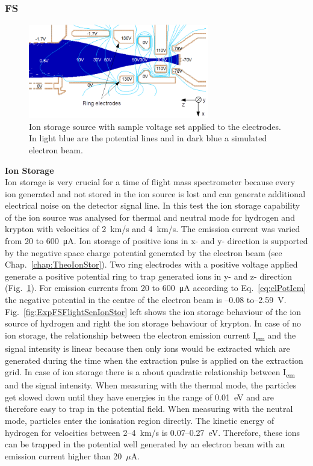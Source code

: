		\subsubsection{FS }\label{chap:FSCalib}
		\begin{figure}[H]
			\centering
			\includegraphics[width = 0.7\textwidth]{Experiments/FiL_IS_elBeam_Storage.png}
			\caption{Ion storage source with sample voltage set applied to the electrodes. In light blue are the potential lines and in dark blue a simulated electron beam.}
			\label{fig:ExpFSFlightSenIonStorIS}
		\end{figure}
		\textbf{Ion Storage}\\
		Ion storage is very crucial for a time of flight mass spectrometer because every ion generated and not stored in the ion source is lost and can generate additional electrical noise on the detector signal line. In this test the ion storage capability of the ion source was analysed for thermal and neutral mode for hydrogen and krypton with velocities of 2~km/s and 4~km/s. The emission current was varied from 20 to 600~\si{\micro\ampere}. Ion storage of positive ions in x- and y- direction is supported by the negative space charge potential generated by the electron beam (see Chap.~\ref{chap:TheoIonStor}). Two ring electrodes with a positive voltage applied generate a positive potential ring to trap generated ions in y- and z- direction (Fig.~\ref{fig:ExpFSFlightSenIonStorIS}). For emission currents from 20 to 600~\si{\micro\ampere} according to Eq.~\eqref{eq:elPotIem} the negative potential in the centre of the electron beam is --0.08 to--2.59~\si{\volt}. Fig.~\ref{fig:ExpFSFlightSenIonStor} left shows the ion storage behaviour of the ion source of hydrogen and right the ion storage behaviour of krypton. In case of no ion storage, the relationship between the electron emission current I\textsubscript{em} and the signal intensity is linear because then only ions would be extracted which are generated during the time when the extraction pulse is applied on the extraction grid. In case of ion storage there is a about quadratic relationship between I\textsubscript{em} and the signal intensity. When measuring with the thermal mode, the particles get slowed down until they have energies in the range of 0.01~\si{\electronvolt} and are therefore easy to trap in the potential field. When measuring with the neutral mode, particles enter the ionisation region directly. The kinetic energy of hydrogen for velocities between 2--4~km/s is 0.07--0.27~eV. Therefore, these ions can be trapped in the potential well generated by an electron beam with an emission current higher than 20~$\mu$A.\\
